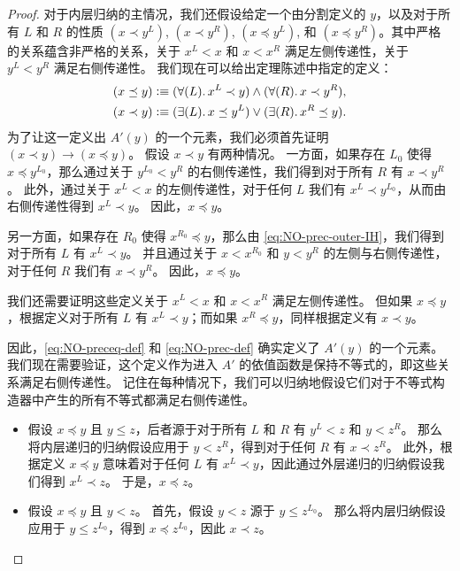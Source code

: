 \begin{proof}
  对于内层归纳的主情况，我们还假设给定一个由分割定义的 $y$，以及对于所有 $L$ 和 $R$ 的性质 $(x\prec y^L)$, $(x\prec y^R)$, $(x\preceq y^L)$, 和 $(x\preceq y^R)$。其中严格的关系蕴含非严格的关系，关于 $x^L<x$ 和 $x<x^R$ 满足左侧传递性，关于 $y^L<y^R$ 满足右侧传递性。
  我们现在可以给出定理陈述中指定的定义：
  \begin{align}
    (x\preceq y) &\defeq
    (\fall{L} x^L\prec y) \land (\fall{R} x\prec y^R), \label{eq:NO-preceq-def}\\
    (x\prec y) &\defeq
    (\exis{L} x\preceq y^L) \lor (\exis{R} x^R \preceq y).\label{eq:NO-prec-def}
  \end{align}
  为了让这一定义出 $A'(y)$ 的一个元素，我们必须首先证明 $(x\prec y) \to (x\preceq y)$。
  假设 $x\prec y$ 有两种情况。
  一方面，如果存在 $L_0$ 使得 $x\preceq y^{L_0}$，那么通过关于 $y^{L_0}<y^R$ 的右侧传递性，我们得到对于所有 $R$ 有 $x\prec y^R$。
  此外，通过关于 $x^L<x$ 的左侧传递性，对于任何 $L$ 我们有 $x^L \prec y^{L_0}$，从而由右侧传递性得到 $x^L\prec y$。
  因此，$x\preceq y$。

  另一方面，如果存在 $R_0$ 使得 $x^{R_0}\preceq y$，那么由 \eqref{eq:NO-prec-outer-IH}，我们得到对于所有 $L$ 有 $x^L \prec y$。
  并且通过关于 $x<x^{R_0}$ 和 $y<y^R$ 的左侧与右侧传递性，对于任何 $R$ 我们有 $x\prec y^R$。
  因此，$x\preceq y$。

  我们还需要证明这些定义关于 $x^L<x$ 和 $x<x^R$ 满足左侧传递性。
  但如果 $x\preceq y$，根据定义对于所有 $L$ 有 $x^L\prec y$；而如果 $x^R\preceq y$，同样根据定义有 $x\prec y$。

  因此，\eqref{eq:NO-preceq-def} 和 \eqref{eq:NO-prec-def} 确实定义了 $A'(y)$ 的一个元素。
  我们现在需要验证，这个定义作为进入 $A'$ 的依值函数是保持不等式的，即这些关系满足右侧传递性。
  记住在每种情况下，我们可以归纳地假设它们对于不等式构造器中产生的所有不等式都满足右侧传递性。
  \begin{itemize}
  \item 假设 $x\preceq y$ 且 $y\le z$，后者源于对于所有 $L$ 和 $R$ 有 $y^L<z$ 和 $y<z^R$。
    那么将内层递归的归纳假设应用于 $y<z^R$，得到对于任何 $R$ 有 $x\prec z^R$。
    此外，根据定义 $x\preceq y$ 意味着对于任何 $L$ 有 $x^L \prec y$，因此通过外层递归的归纳假设我们得到 $x^L \prec z$。
    于是，$x\preceq z$。
  \item 假设 $x\preceq y$ 且 $y<z$。
    首先，假设 $y<z$ 源于 $y\le z^{L_0}$。
    那么将内层归纳假设应用于 $y\le z^{L_0}$，得到 $x \preceq z^{L_0}$，因此 $x\prec z$。


\end{itemize}
\end{proof}
